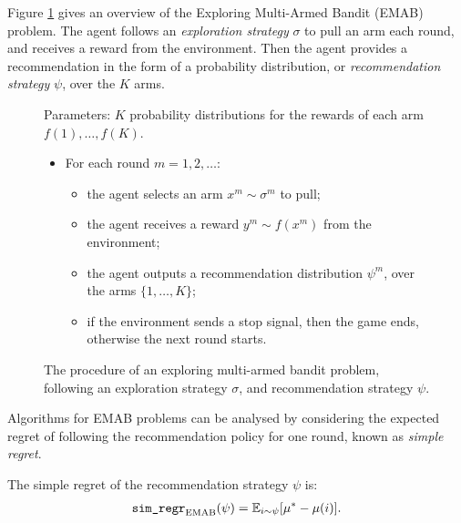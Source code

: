     Figure \ref{fig:2:emab_problem} gives an overview of the Exploring Multi-Armed Bandit (EMAB) problem. The agent follows an \textit{exploration strategy} $\sigma$ to pull an arm each round, and receives a reward from the environment. Then the agent provides a recommendation in the form of a probability distribution, or \textit{recommendation strategy} $\psi$, over the $K$ arms.  

    \begin{figure}
        \begin{tcolorbox}
            Parameters: $K$ probability distributions for the rewards of each arm $f(1),\ldots,f(K)$.
            \begin{itemize}
                \item For each round $m=1,2,\ldots$:
                \begin{itemize}
                    \item the agent selects an arm $x^m\sim\sigma^m$ to pull;
                    \item the agent receives a reward $y^m \sim f(x^m)$ from the environment;
                    \item the agent outputs a recommendation distribution $\psi^m$, over the arms $\{1,\ldots,K\}$;
                    \item if the environment sends a stop signal, then the game ends, otherwise the next round starts.
                \end{itemize} 
            \end{itemize}
        \end{tcolorbox}
        \caption{The procedure of an exploring multi-armed bandit problem, following an exploration strategy $\sigma$, and recommendation strategy $\psi$.}
        \label{fig:2:emab_problem}
    \end{figure}

    Algorithms for EMAB problems can be analysed by considering the expected regret of following the recommendation policy for one round, known as \textit{simple regret}.
    \begin{defn}
        \label{def:2:simple_regret}
        The \textnormal{simple regret} of the recommendation strategy $\psi$ is:
        \begin{align}
            {\textnormal{\texttt{sim\_regr}}}_{{\textnormal{EMAB}}}(\psi) = \mathbb{E}_{i\sim\psi}[\mu^* - \mu(i)]. \label{eq:2:simple_regret_def}
        \end{align}
    \end{defn}

